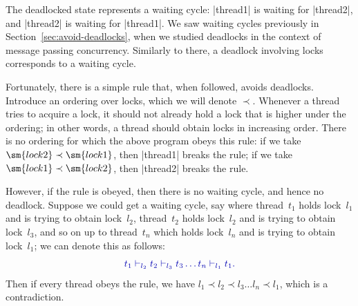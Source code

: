 The deadlocked state represents a waiting cycle: |thread1| is waiting for
|thread2|, and |thread2| is waiting for |thread1|.  We saw waiting cycles
previously in Section~\ref{sec:avoid-deadlocks}, when we studied deadlocks in
the context of message passing concurrency.  Similarly to there, a deadlock
involving locks corresponds to a waiting cycle.

Fortunately, there is a simple rule that, when followed, avoids
deadlocks.  Introduce an ordering over locks, which we will denote $\prec$.
Whenever a thread tries to acquire a lock, it should not already hold a lock
that is higher under the ordering; in other words, a thread should obtain
locks in increasing order.  There is no ordering for which the above program
obeys this rule: if we take $\sm{lock2} \prec \sm{lock1}$, then |thread1|
breaks the rule; if we take $\sm{lock1} \prec \sm{lock2}$, then |thread2|
breaks the rule.  

However, if the rule is obeyed, then there is no waiting cycle, and hence no
deadlock.  Suppose we could get a waiting cycle, say where thread~$t_1$ holds
lock~$l_1$ and is trying to obtain lock~$l_2$, thread~$t_2$ holds lock~$l_2$
and is trying to obtain lock~$l_3$, and so on up to thread~$t_n$ which holds
lock~$l_n$ and is trying to obtain lock~$l_1$; we can denote this as follows:
\[\mstyle
t_1 \waitingFor_{l_2} t_2 \waitingFor_{l_3} t_3 \ldots t_n \waitingFor_{l_1}
t_1 .
\]
Then if every thread obeys the rule, we have $l_1 \prec l_2 \prec l_3 \ldots
l_n \prec l_1$, which is a contradiction. 





